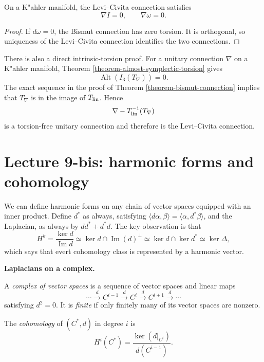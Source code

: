 \begin{corollary}
\label{lemma-kahler-levi-civita-unitary}
On a K"ahler manifold, the Levi--Civita
connection satisfies
$$
\nabla I=0,
\qquad
\nabla\omega=0.
$$
\end{corollary}

\begin{proof}
If $d\omega=0$, the Bismut connection has
zero torsion. It is orthogonal, so uniqueness
of the Levi--Civita connection identifies
the two connections.
\end{proof}

There is also a direct intrinsic-torsion
proof. For a unitary connection $\nabla$ on
a K"ahler manifold, Theorem
\ref{theorem-almost-symplectic-torsion}
gives
$$
\operatorname{Alt}(I_3(T_\nabla))=0.
$$
The exact sequence in the proof of Theorem
\ref{theorem-bismut-connection} implies
that $T_\nabla$ is in the image of
$T_{\rm lin}$. Hence
$$
\nabla-T_{\rm lin}^{-1}(T_\nabla)
$$
is a torsion-free unitary connection and
therefore is the Levi--Civita connection.

\section{Lecture 9-bis: harmonic forms and
cohomology}
\label{section-lecture-nine-bis-harmonic}

\noindent
We can define harmonic forms on any
chain of vector spaces equipped with
an inner product. Define $d^*$
as always, satisfying 
$\langle d \alpha, \beta\rangle
=
\langle \alpha, d^*\beta\rangle$,
and the Laplacian, as always by
$d d^* + d^* d$.
The key observation is that
$$
H^k = \frac{\ker d}{\operatorname{Im} d}
\simeq
\ker d \cap \operatorname{Im} (d)^\perp
\simeq
\ker d \cap \ker d^*
\simeq
\ker \Delta,
$$
which says that evert cohomology
class is represented by a harmonic
vector.

\medskip\noindent
{\bf Laplacians on a complex.}

\begin{definition}
\label{definition-complex-vector-spaces}
A {\it complex of vector spaces} is a
sequence of vector spaces and linear maps
$$
\cdots\xrightarrow{d}C^{i-1}
\xrightarrow{d}C^i
\xrightarrow{d}C^{i+1}
\xrightarrow{d}\cdots
$$
satisfying $d^2=0$. It is {\it finite} if
only finitely many of its vector spaces are
nonzero.
\end{definition}

\begin{definition}
\label{definition-cohomology-complex}
The {\it cohomology} of $(C^*,d)$ in degree
$i$ is
$$
H^i(C^*)
=\frac{\ker(d|_{C^i})}{d(C^{i-1})}.
$$
\end{definition}

